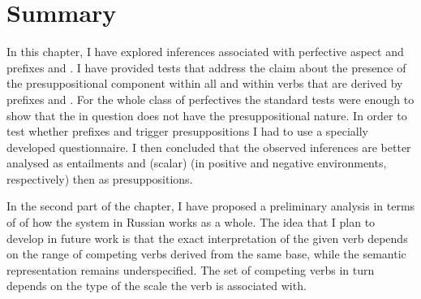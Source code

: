 \section{Summary}
In this chapter, I have explored inferences associated with perfective aspect and prefixes  and . I have provided tests that address the claim about the presence of the presuppositional component within all  and within verbs that are derived by prefixes  and . For the whole class of perfectives the standard tests were enough to show that the  in question does not have the presuppositional nature. In order to test whether prefixes  and  trigger presuppositions I had to use a specially developed questionnaire. I then concluded that the observed inferences are better analysed as entailments and (scalar)  (in positive and negative environments, respectively) then as presuppositions.

In the second part of the chapter, I have proposed a preliminary analysis in terms of  of how the  system in Russian works as a whole. The idea that I plan to develop in future work is that the exact interpretation of the given verb depends on the range of competing verbs derived from the same base, while the semantic representation remains underspecified. The set of competing verbs in turn depends on the type of the scale the verb is associated with.




